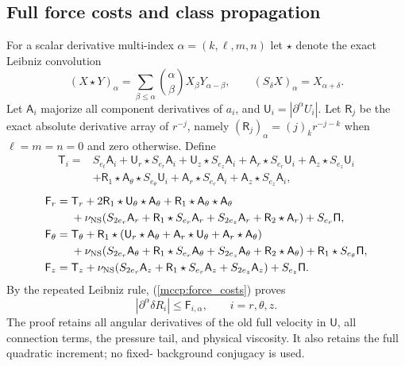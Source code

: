 \subsection{Full force costs and class propagation}

For a scalar derivative multi-index
$\alpha=(k,\ell,m,n)$ let $\star$ denote the exact Leibniz convolution
\[
 (X\star Y)_\alpha=\sum_{\beta\le\alpha}\binom{\alpha}{\beta}
 X_\beta Y_{\alpha-\beta},\qquad
 (S_\delta X)_\alpha=X_{\alpha+\delta}.
\]
Let $\mathsf A_i$ majorize all component derivatives of $a_i$, and
$\mathsf U_i=|\partial^\alpha U_i|$. Let $\mathsf R_j$ be the exact
absolute derivative array of $r^{-j}$, namely
$(\mathsf R_j)_\alpha=(j)_k r^{-j-k}$ when $\ell=m=n=0$ and zero otherwise.
Define
\begin{equation}\label{mccp:transport_cost}
\begin{split}
 \mathsf T_i={}&S_{e_t}\mathsf A_i+\mathsf U_r\star S_{e_r}\mathsf A_i
 +\mathsf U_z\star S_{e_z}\mathsf A_i
 +\mathsf A_r\star S_{e_r}\mathsf U_i
 +\mathsf A_z\star S_{e_z}\mathsf U_i\\
 &+\mathsf R_1\star\mathsf A_\theta\star S_{e_\theta}\mathsf U_i
 +\mathsf A_r\star S_{e_r}\mathsf A_i
 +\mathsf A_z\star S_{e_z}\mathsf A_i,
\end{split}
\end{equation}
\begin{equation}\label{mccp:force_costs}
\begin{aligned}
 \mathsf F_r={}&\mathsf T_r+2\mathsf R_1\star\mathsf U_\theta\star\mathsf A_\theta
 +\mathsf R_1\star\mathsf A_\theta\star\mathsf A_\theta\\
 &+\nu_{\rm NS}(S_{2e_r}\mathsf A_r+\mathsf R_1\star S_{e_r}\mathsf A_r
 +S_{2e_z}\mathsf A_r+\mathsf R_2\star\mathsf A_r)+S_{e_r}\mathsf\Pi,\\
 \mathsf F_\theta={}&\mathsf T_\theta+\mathsf R_1\star(\mathsf U_r\star\mathsf A_\theta
 +\mathsf A_r\star\mathsf U_\theta+\mathsf A_r\star\mathsf A_\theta)\\
 &+\nu_{\rm NS}(S_{2e_r}\mathsf A_\theta+\mathsf R_1\star S_{e_r}\mathsf A_\theta
 +S_{2e_z}\mathsf A_\theta+\mathsf R_2\star\mathsf A_\theta)
 +\mathsf R_1\star S_{e_\theta}\mathsf\Pi,\\
 \mathsf F_z={}&\mathsf T_z+\nu_{\rm NS}(S_{2e_r}\mathsf A_z
 +\mathsf R_1\star S_{e_r}\mathsf A_z+S_{2e_z}\mathsf A_z)
 +S_{e_z}\mathsf\Pi.
\end{aligned}
\end{equation}
By the repeated Leibniz rule, (\ref{mccp:force_costs}) proves
\begin{equation}\label{mccp:force_bound}
 |\partial^\alpha\delta R_i|\le\mathsf F_{i,\alpha},
 \qquad i=r,\theta,z.
\end{equation}
The proof retains all angular derivatives of the old full velocity in
$\mathsf U$, all connection terms, the pressure tail, and physical
viscosity. It also retains the full quadratic increment; no fixed-
background conjugacy is used.

